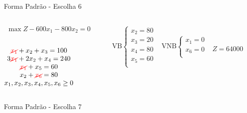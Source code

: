 \begin{frame}
{\begin{block}{Forma Padrão - {\color{cyan}Escolha 6}}
			\begin{columns}
				\begin{column}{0.35\textwidth}
					$
						\begin{matrix}
							\max Z - 600x_1 - 800x_2 = 0 \\
						\end{matrix}
					$ \\
					 \\
					$
						\begin{matrix}
							{\color{red}\cancel{x_1}}  + x_2  + x_3                   = 100 \\
							3{\color{red}\cancel{x_1}} + 2x_2       + x_4             = 240 \\
							{\color{red}\cancel{x_1}}                     + x_5       = 60 \\
							x_2                           + {\color{red}\cancel{x_6}} = 80 \\
							x_1,x_2, x_3, x_4, x_5, x_6 \ge 0 \\
						\end{matrix}
					$
				\end{column}
				\vline
				\hspace{0.1cm}
				\begin{column}{0.45\textwidth}
						$
							\begin{matrix}
								\text{VB} \left\{  \begin{matrix}
																 x_2 = 80 \\
																 x_3 = 20 \\
																 x_4 = 80 \\
																 x_5 = 60 \\
												   \end{matrix} 
										   \right.
								&
								\text{VNB} \left\{  \begin{matrix}
																 x_1 = 0 \\
																 x_6 = 0 \\
												   \end{matrix} 
										   \right. 
								\\
							 & \\
							\end{matrix}
						$
						{\color{red}$ Z = 64000 $}
				\end{column}
			\end{columns}
		\end{block}
	}
	{
		\begin{block}{Forma Padrão - {\color{cyan}Escolha 7}}

\end{block}}
\end{frame}
